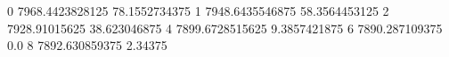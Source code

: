 0 7968.4423828125 78.1552734375
1 7948.6435546875 58.3564453125
2 7928.91015625 38.623046875
4 7899.6728515625 9.3857421875
6 7890.287109375 0.0
8 7892.630859375 2.34375
